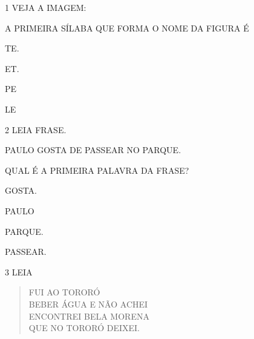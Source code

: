 



\num{1} VEJA A IMAGEM:


A PRIMEIRA SÍLABA QUE FORMA O NOME DA FIGURA É

\begin{escolha}
\item TE.

\item ET.

\item PE

\item LE
\end{escolha}


\num{2} LEIA FRASE.

\begin{mdframed}[linewidth=2pt,linecolor=azul!20,backgroundcolor=azul!20,roundcorner=2pt]
PAULO GOSTA DE PASSEAR NO PARQUE.
\end{mdframed}

QUAL É A PRIMEIRA PALAVRA DA FRASE?

\begin{escolha}
\item GOSTA.

\item PAULO

\item PARQUE.

\item PASSEAR.
\end{escolha}


\num{3} LEIA

\begin{verse}
FUI AO TORORÓ\\
BEBER ÁGUA E NÃO ACHEI\\
ENCONTREI BELA MORENA\\
QUE NO TORORÓ DEIXEI.
\end{verse}

